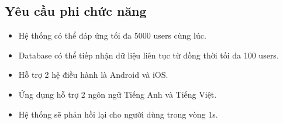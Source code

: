 \subsection{Yêu cầu phi chức năng}
\begin{itemize}
    \item Hệ thống có thể đáp ứng tối đa 5000 users cùng lúc.
    \item Database có thể tiếp nhận dữ liệu liên tục từ đồng thời tối đa 100 users.
    \item Hỗ trợ 2 hệ điều hành là Android và iOS.
    \item Ứng dụng hỗ trợ 2 ngôn ngữ Tiếng Anh và Tiếng Việt.
    \item Hệ thống sẽ phản hồi lại cho người dùng trong vòng 1s.
\end{itemize}

